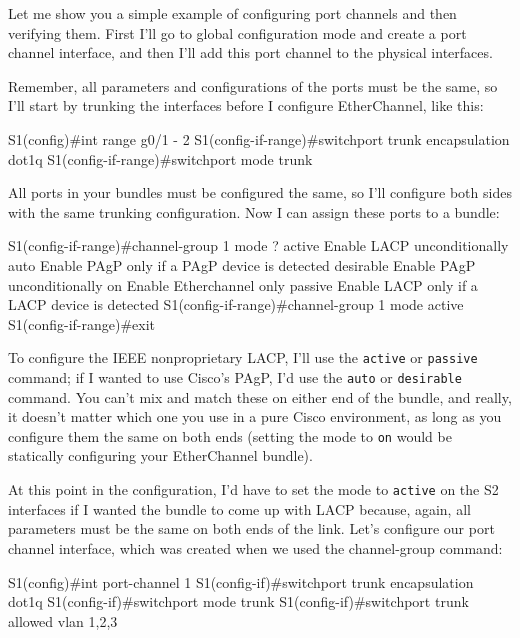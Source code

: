 Let me show you a simple example of configuring port channels and then
verifying them. First I'll go to global configuration mode and create a
port channel interface, and then I'll add this port channel to the
physical interfaces.

Remember, all parameters and configurations of the ports must be the
same, so I'll start by trunking the interfaces before I configure
EtherChannel, like this:

\begin{cli}
S1(config)#int range g0/1 - 2
S1(config-if-range)#switchport trunk encapsulation dot1q
S1(config-if-range)#switchport mode trunk
\end{cli}

All ports in your bundles must be configured the same, so I'll configure
both sides with the same trunking configuration. Now I can assign these
ports to a bundle:

\begin{cli}
S1(config-if-range)#channel-group 1 mode ?
  active     Enable LACP unconditionally
  auto       Enable PAgP only if a PAgP device is detected
  desirable  Enable PAgP unconditionally
  on         Enable Etherchannel only
  passive    Enable LACP only if a LACP device is detected
S1(config-if-range)#channel-group 1 mode active
S1(config-if-range)#exit
\end{cli}

To configure the IEEE nonproprietary LACP, I'll use the \texttt{active}
or \texttt{passive} command; if I wanted to use Cisco's PAgP, I'd use
the \texttt{auto} or \texttt{desirable} command. You can't mix and match
these on either end of the bundle, and really, it doesn't matter which
one you use in a pure Cisco environment, as long as you configure them
the same on both ends (setting the mode to \texttt{on} would be
statically configuring your EtherChannel bundle).

At this point in the configuration, I'd have to set the mode to
\texttt{active} on the S2 interfaces if I wanted the bundle to come up
with LACP because, again, all parameters must be the same on both ends
of the link. Let's configure our port channel interface, which was
created when we used the channel-group command:

\begin{cli}
S1(config)#int port-channel 1
S1(config-if)#switchport trunk encapsulation dot1q
S1(config-if)#switchport mode trunk
S1(config-if)#switchport trunk allowed vlan 1,2,3
\end{cli}

